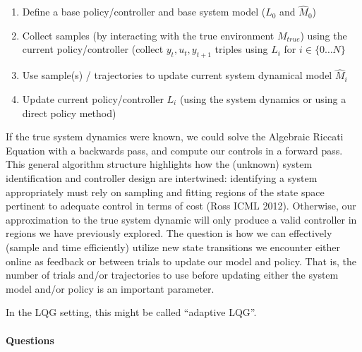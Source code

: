\documentclass[
  a4paper,
]{article}
\providecommand{\tightlist}{%
  \setlength{\itemsep}{0pt}\setlength{\parskip}{0pt}}
\begin{document}
\begin{enumerate}
\def\labelenumi{\arabic{enumi}.}
\setcounter{enumi}{-1}
\tightlist
\item
  Define a base policy/controller and base system model (\(L_0\) and
  \(\hat{M}_0\))
\item
  Collect samples (by interacting with the true environment
  \(M_{true}\)) using the current policy/controller (collect
  \(y_t,u_t,y_{t+1}\) triples using \(L_i\) for \(i \in \{0\dots N\}\)
\item
  Use sample(s) / trajectories to update current system dynamical model
  \(\hat{M}_i\)
\item
  Update current policy/controller \(L_i\) (using the system dynamics or
  using a direct policy method)
\end{enumerate}

If the true system dynamics were known, we could solve the Algebraic
Riccati Equation with a backwards pass, and compute our controls in a
forward pass. This general algorithm structure highlights how the
(unknown) system identification and controller design are intertwined:
identifying a system appropriately must rely on sampling and fitting
regions of the state space pertinent to adequate control in terms of
cost (Ross ICML 2012). Otherwise, our approximation to the true system
dynamic will only produce a valid controller in regions we have
previously explored. The question is how we can effectively (sample and
time efficiently) utilize new state transitions we encounter either
online as feedback or between trials to update our model and policy.
That is, the number of trials and/or trajectories to use before updating
either the system model and/or policy is an important parameter.

In the LQG setting, this might be called ``adaptive LQG''.

\hypertarget{questions-1}{%
\paragraph{Questions}\label{questions-1}}
\end{document}
